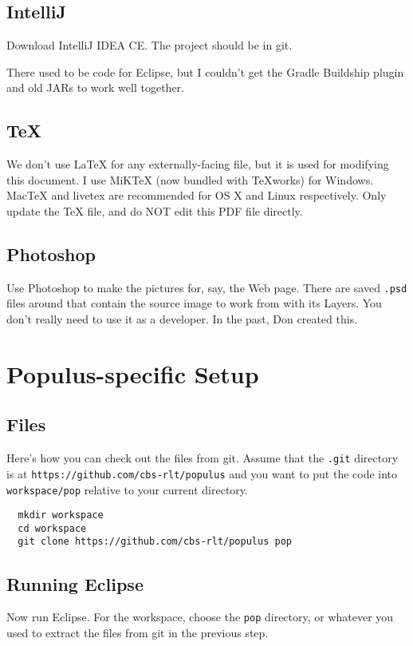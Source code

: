 \documentclass[12pt]{article}
\begin{document}
\subsection{IntelliJ}
Download IntelliJ IDEA CE. The project should be in git.

There used to be code for Eclipse, but I couldn't get the Gradle Buildship plugin and old JARs to work well together.

\subsection{TeX}
We don't use LaTeX for any externally-facing file, but it is used for modifying this document.  I use MiKTeX (now bundled with TeXworks) for Windows.  MacTeX and livetex are recommended for OS X and Linux respectively.  Only update the TeX file, and do NOT edit this PDF file directly.

\subsection{Photoshop}
Use Photoshop to make the pictures for, say, the Web page.  There are saved \texttt{.psd} files around that contain the source image to work from with its Layers.  You don't really need to use it as a developer.  In the past, Don created this.

\section{Populus-specific Setup}
\subsection{Files}

Here's how you can check out the files from git.  Assume that the \texttt{.git} directory is at \texttt{https://github.com/cbs-rlt/populus} and you want to put the code into \texttt{workspace/pop} relative to your current directory.

\begin{verbatim}
  mkdir workspace
  cd workspace
  git clone https://github.com/cbs-rlt/populus pop
\end{verbatim}

\subsection{Running Eclipse}
Now run Eclipse.  For the workspace, choose the \texttt{pop} directory, or whatever you used to extract the files from git in the previous step.
\end{document}
